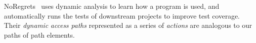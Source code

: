 NoRegrets~ uses dynamic analysis to learn how a program
is used, and automatically runs the tests of downstream projects to
improve test coverage.
Their \emph{dynamic access paths} represented as
a series of \emph{actions} are analogous to our paths of path elements.



